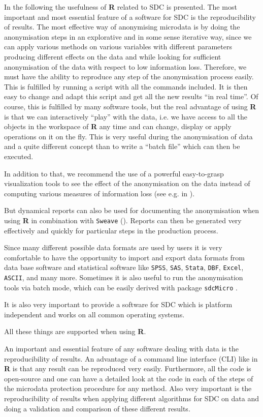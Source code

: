 \documentclass[12pt]{article}
\begin{document}
In the following the usefulness of {\bf R} related to SDC is presented.
The most important and most essential feature of a software for SDC is the reproducibility of results. The most effective way of anonymising microdata is by doing the anonymisation steps in an explorative and in some sense iterative way, since we can apply various methods on various variables with different parameters producing different effects on the data and while looking for sufficient anonymisation of the data with respect to low information loss. Therefore, we must have the ability to reproduce any step of the anonymisation process easily. This is fulfilled by running a script with all the commands included. It is then easy to change and adapt this script and get all the new results ``in real time''. Of course, this is fulfilled by many software tools, but the real advantage of using {\bf R} is that we can interactively ``play'' with the data, i.e. we have access to all the objects in the workspace of {\bf R} any time and can change, display or apply operations on it on the fly. This is very useful during the anonymisation of data and a quite different concept than to write a ``batch file'' which can then be executed.  

In addition to that, we recommend the use of a powerful easy-to-grasp visualization tools to see the effect of the anonymisation on the data instead of computing various measures of information loss (see e.g. in \cite{Templ06}).

But dynamical reports can also be used for documenting the anonymisation  when using {\bf R} in combination with {\tt Sweave} (\cite{Leisch02}). Reports can then be generated very effectively and quickly for particular steps in the production process.

Since many different possible data formats are used by users it is very comfortable to have the opportunity to import and export data formats from data base software and statistical software like {\tt SPSS}, {\tt SAS}, {\tt Stata}, {\tt DBF}, {\tt Excel}, {\tt ASCII}, and many more. Sometimes it is also useful to run the anonymisation tools via batch mode, which can be easily derived with package {\tt sdcMicro} \citep{TemplR07}.

It is also very important to provide a software for SDC which is platform independent and works on all common operating systems.

All these things are supported when using {\bf R}.

An important and essential feature of any software dealing with data is the reproducibility of results. An advantage of a command line interface (CLI) like in {\bf R} is that any result can be reproduced very easily. Furthermore, all the code is open-source and one can have a detailed look at the code in each of the steps of the microdata protection procedure for any method. Also very important is the reproducibility of results when applying different algorithms for SDC on data and doing a validation and comparison of these different results.
\end{document}

